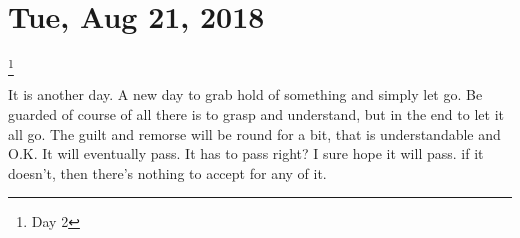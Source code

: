 \section{Tue, Aug 21, 2018}\footnote{Day 2}

It is another day. A new day to grab hold of something and simply let go. Be guarded
of course of all there is to grasp and understand, but in the end to let it all go.
The guilt and remorse will be round for a bit, that is understandable and O.K. It
will eventually pass. It has to pass right? I sure hope it will pass. if it doesn't,
then there's nothing to accept for any of it.